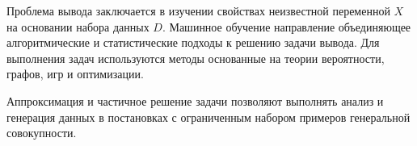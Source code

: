 Проблема вывода заключается в изучении свойствах неизвестной переменной $X$
на основании набора данных $D$. Машинное обучение направление объединяющее алгоритмические и статистические подходы к решению задачи вывода.
Для выполнения задач используются методы основанные на теории вероятности, графов, игр и оптимизации. 


Аппроксимация и частичное решение задачи позволяют выполнять анализ и генерация данных 
в постановках с ограниченным набором примеров генеральной совокупности.



